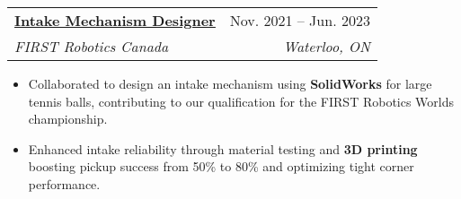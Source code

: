 \documentclass[letterpaper]{article}
\makeatletter
\newcommand{\resumeItem}[1]{
  \item\small{
    {#1 \vspace{-2pt}}
  }
}
\newcommand{\resumeSubheading}[4]{
  \vspace{-2pt}\item
    \begin{tabular*}{0.97\textwidth}[t]{l@{\extracolsep{\fill}}r}
      \textbf{#1} & #2 \\
      \textit{\small#3} & \textit{\small #4} \\
    \end{tabular*}\vspace{-7pt}
}
\newcommand{\resumeItemListStart}{\begin{itemize}}
\newcommand{\resumeItemListEnd}{\end{itemize}\vspace{-5pt}}
\makeatother
\begin{document}
    \resumeSubheading
      {\underline{\href{https://www.gavintranquilino.com/rapid-react.html}{Intake Mechanism Designer}}}{Nov. 2021 -- Jun. 2023}
      {FIRST Robotics Canada}{Waterloo, ON}
      \resumeItemListStart
        \resumeItem{Collaborated to design an intake mechanism using \textbf{SolidWorks} for large tennis balls, contributing to our qualification for the FIRST Robotics Worlds championship.}
        \resumeItem{Enhanced intake reliability through material testing and \textbf{3D printing} boosting pickup success from 50\% to 80\% and optimizing tight corner performance.}
      \resumeItemListEnd


\end{document}
